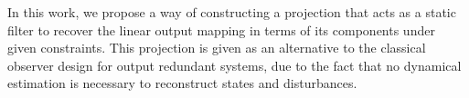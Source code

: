 \documentclass[11pt]{article}
\begin{document}
In this work, we propose a way of constructing a projection that acts as a static filter to recover the linear output mapping in terms of its components under given constraints. This projection is given as an alternative to the classical observer design for output redundant systems, due to the fact that no dynamical estimation is necessary to reconstruct states and disturbances. 









\end{document}
